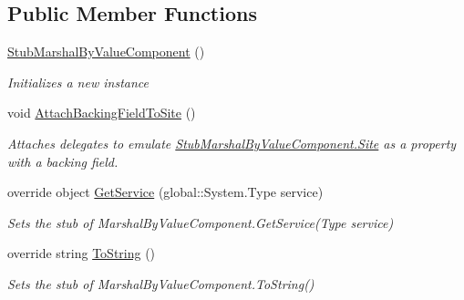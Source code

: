 \subsection*{Public Member Functions}
\begin{DoxyCompactItemize}
\item 
\hyperlink{class_system_1_1_component_model_1_1_fakes_1_1_stub_marshal_by_value_component_abbd926dd2e4dfd9e6e07afca808e2604}{Stub\-Marshal\-By\-Value\-Component} ()
\begin{DoxyCompactList}\small\item\em Initializes a new instance\end{DoxyCompactList}\item 
void \hyperlink{class_system_1_1_component_model_1_1_fakes_1_1_stub_marshal_by_value_component_a22b1aa0870ba09d18c437e23d46edee8}{Attach\-Backing\-Field\-To\-Site} ()
\begin{DoxyCompactList}\small\item\em Attaches delegates to emulate \hyperlink{class_system_1_1_component_model_1_1_fakes_1_1_stub_marshal_by_value_component_a2b1c094847d7c2872ea0d07dbbc5dd2e}{Stub\-Marshal\-By\-Value\-Component.\-Site} as a property with a backing field.\end{DoxyCompactList}\item 
override object \hyperlink{class_system_1_1_component_model_1_1_fakes_1_1_stub_marshal_by_value_component_ae80a87c1fee5fa846eb52bd0839dbb78}{Get\-Service} (global\-::\-System.\-Type service)
\begin{DoxyCompactList}\small\item\em Sets the stub of Marshal\-By\-Value\-Component.\-Get\-Service(\-Type service)\end{DoxyCompactList}\item 
override string \hyperlink{class_system_1_1_component_model_1_1_fakes_1_1_stub_marshal_by_value_component_a0422cd8dda40af6973ac560e9f5abcbc}{To\-String} ()
\begin{DoxyCompactList}\small\item\em Sets the stub of Marshal\-By\-Value\-Component.\-To\-String()\end{DoxyCompactList}\end{DoxyCompactItemize}
